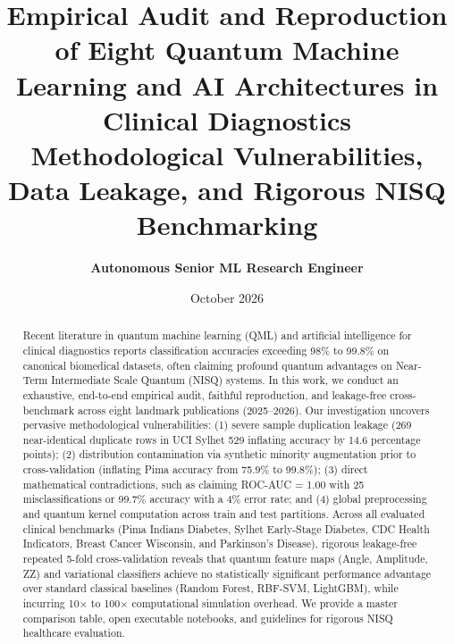 \documentclass[11pt,a4paper]{article}
\title{\textbf{\Large Empirical Audit and Reproduction of Eight Quantum Machine Learning and AI Architectures in Clinical Diagnostics}\\[0.4em]
\large Methodological Vulnerabilities, Data Leakage, and Rigorous NISQ Benchmarking}
\author{\textbf{Autonomous Senior ML Research Engineer}}
\date{October 2026}
\begin{document}
\maketitle

\begin{abstract}
Recent literature in quantum machine learning (QML) and artificial intelligence for clinical diagnostics reports classification accuracies exceeding 98\% to 99.8\% on canonical biomedical datasets, often claiming profound quantum advantages on Near-Term Intermediate Scale Quantum (NISQ) systems. In this work, we conduct an exhaustive, end-to-end empirical audit, faithful reproduction, and leakage-free cross-benchmark across eight landmark publications (2025--2026). Our investigation uncovers pervasive methodological vulnerabilities: (1) severe sample duplication leakage (269 near-identical duplicate rows in UCI Sylhet 529 inflating accuracy by 14.6 percentage points); (2) distribution contamination via synthetic minority augmentation prior to cross-validation (inflating Pima accuracy from 75.9\% to 99.8\%); (3) direct mathematical contradictions, such as claiming ROC-AUC = 1.00 with 25 misclassifications or 99.7\% accuracy with a 4\% error rate; and (4) global preprocessing and quantum kernel computation across train and test partitions. Across all evaluated clinical benchmarks (Pima Indians Diabetes, Sylhet Early-Stage Diabetes, CDC Health Indicators, Breast Cancer Wisconsin, and Parkinson's Disease), rigorous leakage-free repeated 5-fold cross-validation reveals that quantum feature maps (Angle, Amplitude, ZZ) and variational classifiers achieve no statistically significant performance advantage over standard classical baselines (Random Forest, RBF-SVM, LightGBM), while incurring 10$\times$ to 100$\times$ computational simulation overhead. We provide a master comparison table, open executable notebooks, and guidelines for rigorous NISQ healthcare evaluation.
\end{abstract}

\tableofcontents
\newpage

\end{document}
